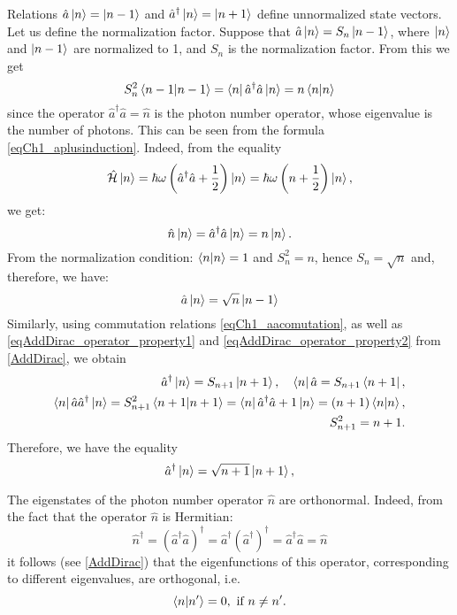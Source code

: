 Relations 
$\hat{a} \ket{n} = \ket{n - 1}$
and
$\hat{a}^{\dag} \ket{n} = \ket{n + 1}$
define unnormalized state vectors. Let us define the normalization
factor. Suppose that  
$\hat{a} \ket{n} = S_n \ket{n - 1}$,  where 
$\ket{n}$ and $\ket{n - 1}$ are normalized to  1,  and $S_n$
is the normalization factor. From this we get 
\[
S_n^2\bra{n - 1}\ket{n - 1} =
\bra{n}\hat{a}^{\dag}\hat{a}\ket{n} = 
n  \bra{n}\ket{n}
\]
since the operator    
$\hat{a}^{\dag}\hat{a} = \hat{n}$
is the photon number operator, whose eigenvalue
is the number of photons. This can be seen from the formula
\eqref{eqCh1_aplusinduction}. Indeed, from the equality
\[
\hat{\mathcal{H}} \ket{n} =
\hbar \omega \left(
\hat{a}^{\dag}\hat{a} + \frac{1}{2}
\right)
\ket{n} = 
\hbar \omega \left(n + \frac{1}{2}\right)
\ket{n},
\]
we get:
\[
\hat{n}\ket{n} = \hat{a}^{\dag}\hat{a} \ket{n} = n
\ket{n}. 
\]
From the normalization condition: $\bra{n}\ket{n} = 1$   and
$S_n^2 = n$,  hence $S_n = \sqrt{n}$ and, therefore, we have: 
\begin{equation}
\hat{a}\ket{n} = \sqrt{n}\ket{n - 1}
\end{equation}
Similarly, using commutation relations
\eqref{eqCh1_aacomutation}, as well as \ref{eqAddDirac_operator_property1} and
  \ref{eqAddDirac_operator_property2} from \autoref{AddDirac},
  we obtain 
\begin{eqnarray}
\hat{a}^{\dag}\ket{n} = S_{n+1}\ket{n + 1},
\quad 
\bra{n}\hat{a} = S_{n + 1}\bra{n + 1},
\nonumber \\
\bra{n}\hat{a}\hat{a}^{\dag}\ket{n} = S_{n+1}^2
\bra{n + 1}\ket{n + 1} = 
\bra{n}\hat{a}^{\dag}\hat{a} + 1\ket{n} = 
\left(n + 1\right)\bra{n}\ket{n},
\nonumber \\
S_{n+1}^2 = n + 1.
\end{eqnarray}
Therefore, we have the equality
\begin{equation}
\hat{a}^{\dag}\ket{n} = \sqrt{n + 1}\ket{n + 1},
\end{equation}

The eigenstates of the photon number operator $\hat{n}$ are orthonormal. 
Indeed, from the fact that the operator $\hat{n}$ is Hermitian:
\[
\hat{n}^{\dag} = \left(\hat{a}^{\dag}\hat{a}\right)^{\dag} = 
\hat{a}^{\dag} \left(\hat{a}^{\dag}\right)^{\dag} = 
\hat{a}^{\dag}\hat{a} = \hat{n}
\]
it follows (see \autoref{AddDirac}) that the eigenfunctions of this operator,
corresponding to different eigenvalues, are orthogonal, i.e.
\begin{equation}
\bra{n}\ket{n'} = 0, \mbox{ if } n \ne n'.
\label{eqOrtoN}
\end{equation}

